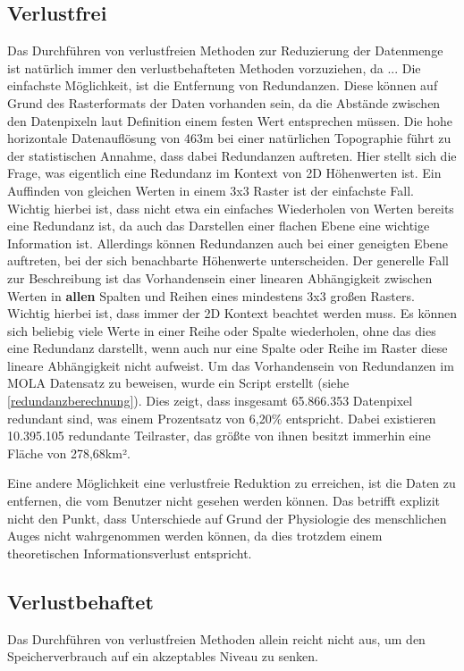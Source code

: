 \subsection{Verlustfrei}
Das Durchführen von verlustfreien Methoden zur Reduzierung der Datenmenge ist natürlich immer den verlustbehafteten Methoden vorzuziehen, da ...
Die einfachste Möglichkeit, ist die Entfernung von Redundanzen. Diese können auf Grund des Rasterformats der Daten vorhanden sein, da die Abstände zwischen den Datenpixeln laut Definition einem festen Wert entsprechen müssen. Die hohe horizontale Datenauflösung von 463m bei einer natürlichen Topographie führt zu der statistischen Annahme, dass dabei Redundanzen auftreten. Hier stellt sich die Frage, was eigentlich eine Redundanz im Kontext von 2D Höhenwerten ist. Ein Auffinden von gleichen Werten in einem 3x3 Raster ist der einfachste Fall. Wichtig hierbei ist, dass nicht etwa ein einfaches Wiederholen von Werten bereits eine Redundanz ist, da auch das Darstellen einer flachen Ebene eine wichtige Information ist. Allerdings können Redundanzen auch bei einer geneigten Ebene auftreten, bei der sich benachbarte Höhenwerte unterscheiden. Der generelle Fall zur Beschreibung ist das Vorhandensein einer linearen Abhängigkeit zwischen Werten in \textbf{allen} Spalten und Reihen eines mindestens 3x3 großen Rasters\cite{topoDataReduction}. Wichtig hierbei ist, dass immer der 2D Kontext beachtet werden muss. Es können sich beliebig viele Werte in einer Reihe oder Spalte wiederholen, ohne das dies eine Redundanz darstellt, wenn auch nur eine Spalte oder Reihe im Raster diese lineare Abhängigkeit nicht aufweist. Um das Vorhandensein von Redundanzen im MOLA Datensatz zu beweisen, wurde ein Script erstellt (siehe \ref{redundanzberechnung}). Dies zeigt, dass insgesamt 65.866.353 Datenpixel redundant sind, was einem Prozentsatz von 6,20\% entspricht. Dabei existieren 10.395.105 redundante Teilraster, das größte von ihnen besitzt immerhin eine Fläche von 278,68km².

Eine andere Möglichkeit eine verlustfreie Reduktion zu erreichen, ist die Daten zu entfernen, die vom Benutzer nicht gesehen werden können. Das betrifft explizit nicht den Punkt, dass Unterschiede auf Grund der Physiologie des menschlichen Auges nicht wahrgenommen werden können, da dies trotzdem einem theoretischen Informationsverlust entspricht.



\subsection{Verlustbehaftet}
Das Durchführen von verlustfreien Methoden allein reicht nicht aus, um den Speicherverbrauch auf ein akzeptables Niveau zu senken.

